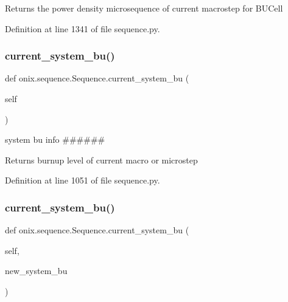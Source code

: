 \begin{DoxyVerb}Returns the power density microsequence of current macrostep
for BUCell\end{DoxyVerb}
 

Definition at line 1341 of file sequence.\+py.

\mbox{\label{classonix_1_1sequence_1_1Sequence_a6c98046f77413da7f3f0d77b5341aaf4}} 
\subsubsection{\texorpdfstring{current\+\_\+system\+\_\+bu()}{current\_system\_bu()}\hspace{0.1cm}{\footnotesize\ttfamily [1/2]}}
{\footnotesize\ttfamily def onix.\+sequence.\+Sequence.\+current\+\_\+system\+\_\+bu (\begin{DoxyParamCaption}\item[{}]{self }\end{DoxyParamCaption})}



system bu info \#\#\#\#\#\# 

\begin{DoxyVerb}Returns burnup level of current macro or microstep
\end{DoxyVerb}
 

Definition at line 1051 of file sequence.\+py.

\mbox{\label{classonix_1_1sequence_1_1Sequence_af203be1b2457e37f2df77ff79cbef53b}} 
\subsubsection{\texorpdfstring{current\+\_\+system\+\_\+bu()}{current\_system\_bu()}\hspace{0.1cm}{\footnotesize\ttfamily [2/2]}}
{\footnotesize\ttfamily def onix.\+sequence.\+Sequence.\+current\+\_\+system\+\_\+bu (\begin{DoxyParamCaption}\item[{}]{self,  }\item[{}]{new\+\_\+system\+\_\+bu }\end{DoxyParamCaption})}


